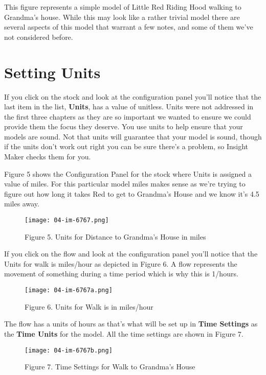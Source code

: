 \documentclass[]{memoir}
\makeatletter
\def\maxwidth{\ifdim\Gin@nat@width>\linewidth\linewidth
\else\Gin@nat@width\fi}
\let\Oldincludegraphics\includegraphics
\renewcommand{\includegraphics}[1]{\Oldincludegraphics[width=\maxwidth]{#1}}
\renewcommand{\u}[1]{\textbf{#1}}
\renewcommand{\a}[1]{\textbf{#1}}
\makeatother
\begin{document}
\begin{oframed}
\begin{enumerate}
This figure represents a simple model of Little Red Riding Hood walking to Grandma's house. While this may look like a rather trivial model there are several aspects of this model that warrant a few notes, and some of them we've not considered before.



\end{enumerate} \end{oframed}

\section{Setting Units}

If you click on the stock and look at the configuration panel you'll
notice that the last item in the list, \a{Units}, has a value of
unitless. Units were not addressed in the first three chapters as they
are so important we wanted to ensure we could provide them the focus
they deserve. You use units to help ensure that your models are sound.
Not that units will guarantee that your model is sound, though if the
units don't work out right you can be sure there's a problem, so Insight
Maker checks them for you.

Figure 5 shows the Configuration Panel for the stock where Units is
assigned a value of miles. For this particular model miles makes sense
as we're trying to figure out how long it takes Red to get to Grandma's
House and we know it's 4.5 miles away.

\begin{figure}[htbp]
\centering
\texttt{[image: 04-im-6767.png]}
\caption{Figure 5. Units for Distance to Grandma's House in miles}
\end{figure}

If you click on the flow and look at the configuration panel you'll
notice that the Units for walk is miles/hour as depicted in Figure 6. A
flow represents the movement of something during a time period which is
why this is 1/hours.

\begin{figure}[htbp]
\centering
\texttt{[image: 04-im-6767a.png]}
\caption{Figure 6. Units for Walk is in miles/hour}
\end{figure}

The flow has a units of hours as that's what will be set up in
\u{Time Settings} as the \u{Time Units} for the model. All the time
settings are shown in Figure 7.

\begin{figure}[htbp]
\centering
\texttt{[image: 04-im-6767b.png]}
\caption{Figure 7. Time Settings for Walk to Grandma's House}
\end{figure}
\end{document}
